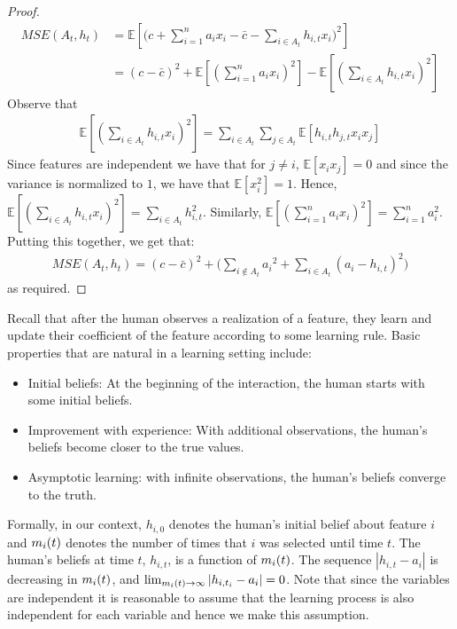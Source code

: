\begin{proof}
    \begin{align*}
MSE(A_t,h_t) &=\mathbb{E}[\big(c + \sum_{i=1}^n a_i x_i - \bar{c} - \sum_{i \in A_t} h_{i,t} x_i\big)^2] \\
&= (c-\bar c)^2 + \mathbb{E}[(\sum_{i=1}^n a_i x_i)^2] - \mathbb{E}[(\sum_{i \in A_t} h_{i,t} x_i)^2] 
\end{align*}
Observe that
\begin{align*}
 \mathbb{E}[(\sum_{i \in A_t} h_{i,t} x_i)^2] = \sum_{i \in A_t} \sum_{j \in A_t} \mathbb{E}[h_{i,t} h_{j,t} x_i x_j] 
\end{align*}
Since features are independent we have that for $j\neq i$, $\mathbb{E}[x_ix_j]=0$ and since the variance is normalized to $1$, we have that $\mathbb{E}[x_i^2] =1$. Hence, $\mathbb{E}[(\sum_{i \in A_t} h_{i,t} x_i)^2] = \sum_{i \in A_t} h_{i,t}^2$. Similarly, $\mathbb{E}[(\sum_{i=1}^n a_i x_i)^2] = \sum_{i=1}^n a_i^2$. Putting this together, we get that:
\begin{align} \label{eq:MSE}
    MSE(A_t,h_t) = (c-\bar c)^2 + \big(\sum_{i \notin A_t} {a_i}^2 + \sum_{i \in A_t} (a_i - h_{i,t})^2 \big)
\end{align}
as required.
\end{proof}



Recall that after the human observes a realization of a feature, they learn %
and update their coefficient of the feature according to some learning rule. Basic properties that are natural in a learning setting include: 
\begin{itemize}
       \item Initial beliefs: At the beginning of the interaction, the human starts with some initial beliefs.
    \item Improvement with experience: 
    With additional observations, the human's beliefs become closer to the true values.
    \item Asymptotic learning: with infinite observations, the human's beliefs converge to the truth.
\end{itemize}

Formally, in our context, $h_{i,0}$ denotes the human's initial belief about feature $i$ and $m_{i}(t)$ denotes the number of times that $i$ was selected until time $t$.
The human's beliefs at time $t$, $h_{i,t}$, is a function of $m_{i}(t)$. 
The sequence $|h_{i,t} - a_i|$ is decreasing in $m_{i}(t)$, and $\lim_{m_{i}(t) \rightarrow \infty}  |h_{i,t_i} - a_i| = 0$. 
Note that since the variables are independent it is reasonable to assume that the learning process is also  independent for each variable and hence we make this assumption.


